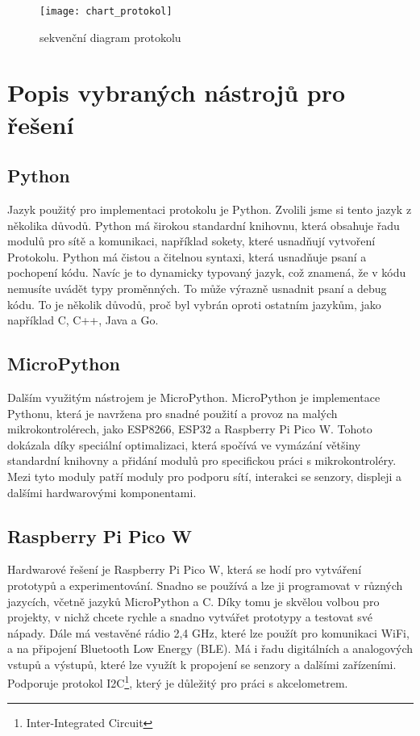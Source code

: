 \documentclass[12pt]{report}			%
\begin{document}
\begin{figure}[h]
\caption{sekvenční diagram protokolu}
\centering
 \texttt{[image: chart\_protokol]}
\end{figure}

\section{Popis vybraných  nástrojů pro řešení}

\subsection{Python}

Jazyk použitý pro implementaci protokolu je Python. Zvolili jsme si tento jazyk z několika důvodů. 
Python má širokou standardní knihovnu, která obsahuje řadu modulů pro sítě a komunikaci, například sokety, které usnadňují vytvoření Protokolu.
Python má čistou a čitelnou syntaxi, která usnadňuje psaní a pochopení kódu. Navíc je to dynamicky typovaný jazyk, což znamená, že v kódu nemusíte uvádět typy proměnných. To může výrazně usnadnit psaní a debug kódu.
To je několik důvodů, proč byl vybrán oproti ostatním jazykům, jako například C, C++, Java a Go.\cite{python}

\subsection{MicroPython}

Dalším využitým nástrojem je MicroPython. MicroPython je implementace Pythonu, která je navržena pro snadné použití a provoz na malých mikrokontrolérech, jako ESP8266, ESP32 a Raspberry Pi Pico W. Tohoto dokázala díky speciální optimalizaci, která spočívá ve vymázání většiny standardní knihovny a přidání modulů pro specifickou práci s mikrokontroléry. Mezi tyto moduly patří moduly pro podporu sítí, interakci se senzory, displeji a dalšími hardwarovými komponentami.\cite{micropython}

\subsection{Raspberry Pi Pico W }

Hardwarové řešení je Raspberry Pi Pico W, která se hodí pro vytváření prototypů a experimentování. Snadno se používá a lze ji programovat v různých jazycích, včetně jazyků MicroPython a C. Díky tomu je skvělou volbou pro projekty, v nichž chcete rychle a snadno vytvářet prototypy a testovat své nápady. Dále má vestavěné rádio 2,4 GHz, které lze použít pro komunikaci WiFi, a na připojení Bluetooth Low Energy (BLE). Má i řadu digitálních a analogových vstupů a výstupů, které lze využít k propojení se senzory a dalšími zařízeními. Podporuje protokol I2C\footnote{Inter-Integrated Circuit}, který je důležitý pro práci s akcelometrem.  \cite{raspberry}
\end{document}
